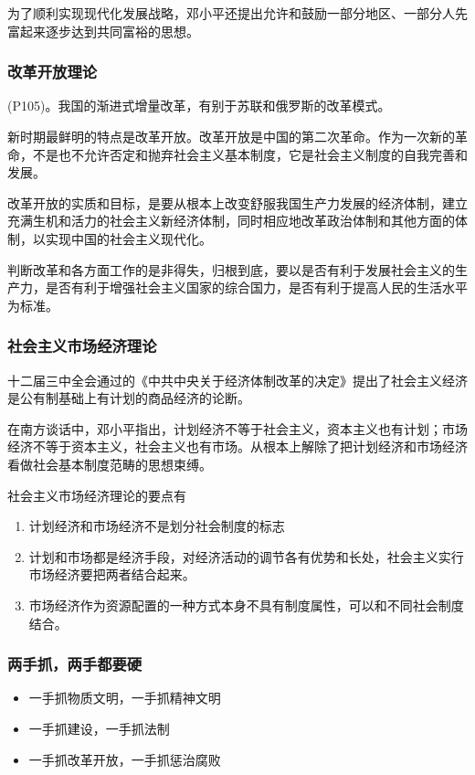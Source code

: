         为了顺利实现现代化发展战略，邓小平还提出允许和鼓励一部分地区、一部分人先富起来逐步达到共同富裕的思想。

        \subsubsection{改革开放理论}
        (P105)。我国的渐进式增量改革，有别于苏联和俄罗斯的改革模式。

        新时期最鲜明的特点是改革开放。改革开放是中国的第二次革命。作为一次新的革命，不是也不允许否定和抛弃社会主义基本制度，它是社会主义制度的自我完善和发展。
        
        改革开放的实质和目标，是要从根本上改变舒服我国生产力发展的经济体制，建立充满生机和活力的社会主义新经济体制，同时相应地改革政治体制和其他方面的体制，以实现中国的社会主义现代化。

        判断改革和各方面工作的是非得失，归根到底，要以是否有利于发展社会主义的生产力，是否有利于增强社会主义国家的综合国力，是否有利于提高人民的生活水平为标准。

        \subsubsection{社会主义市场经济理论}

        十二届三中全会通过的《中共中央关于经济体制改革的决定》提出了社会主义经济是公有制基础上有计划的商品经济的论断。

        在南方谈话中，邓小平指出，计划经济不等于社会主义，资本主义也有计划；市场经济不等于资本主义，社会主义也有市场。从根本上解除了把计划经济和市场经济看做社会基本制度范畴的思想束缚。

        社会主义市场经济理论的要点有
        \begin{enumerate}
            \item 计划经济和市场经济不是划分社会制度的标志
            \item 计划和市场都是经济手段，对经济活动的调节各有优势和长处，社会主义实行市场经济要把两者结合起来。
            \item 市场经济作为资源配置的一种方式本身不具有制度属性，可以和不同社会制度结合。
        \end{enumerate}

        \subsubsection{两手抓，两手都要硬}
        \begin{itemize}
            \item 一手抓物质文明，一手抓精神文明
            \item 一手抓建设，一手抓法制
            \item 一手抓改革开放，一手抓惩治腐败
        \end{itemize}

